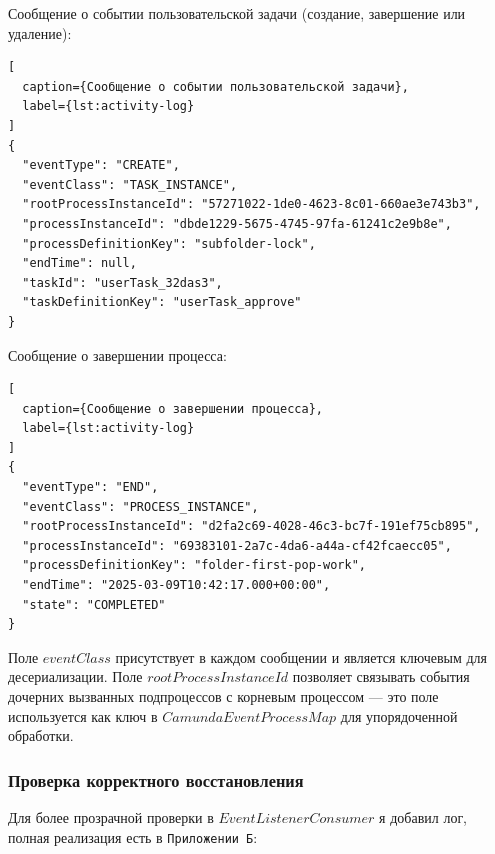 Сообщение о событии пользовательской задачи (создание, завершение или  
удаление):

\begin{lstlisting}[
  caption={Сообщение о событии пользовательской задачи},
  label={lst:activity-log}
]
{               
  "eventType": "CREATE",
  "eventClass": "TASK_INSTANCE",
  "rootProcessInstanceId": "57271022-1de0-4623-8c01-660ae3e743b3",                             
  "processInstanceId": "dbde1229-5675-4745-97fa-61241c2e9b8e",
  "processDefinitionKey": "subfolder-lock",                                
  "endTime": null,
  "taskId": "userTask_32das3",                                            
  "taskDefinitionKey": "userTask_approve"
}  
\end{lstlisting}                                                                    
                
Сообщение о завершении процесса:                                       
\begin{lstlisting}[
  caption={Сообщение о завершении процесса},
  label={lst:activity-log}
]
{                                                                      
  "eventType": "END",
  "eventClass": "PROCESS_INSTANCE",
  "rootProcessInstanceId": "d2fa2c69-4028-46c3-bc7f-191ef75cb895",
  "processInstanceId": "69383101-2a7c-4da6-a44a-cf42fcaecc05",
  "processDefinitionKey": "folder-first-pop-work",                                
  "endTime": "2025-03-09T10:42:17.000+00:00",
  "state": "COMPLETED"                                                 
}   
\end{lstlisting}

Поле $eventClass$ присутствует в каждом сообщении и является ключевым для
десериализации. Поле $rootProcessInstanceId$ позволяет связывать
события дочерних вызванных подпроцессов с корневым процессом — это
поле используется как ключ в $CamundaEventProcessMap$ для
упорядоченной обработки.

\subsubsection{Проверка корректного восстановления}

Для более прозрачной проверки в $EventListenerConsumer$ я добавил лог, полная реализация есть в \texttt{Приложении Б}:

